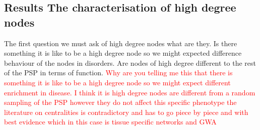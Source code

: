 \subsection{Results The characterisation of high degree nodes}
The first question we must ask of high degree nodes what are they. Is there something it is like to be a high degree node so we might expected difference behaviour of the nodes in disorders.
Are nodes of high degree different to the rest of the PSP in terms of function. 
\textcolor{red}{Why are you telling me this that there is something it is like to be a high degree node so we might expect different enrichment in disease. I think it is high degree nodes are different from a random sampling of the PSP however they do not affect this specific phenotype the literature on centralities is contradictory and has to go piece by piece and with best evidence which in this case is tissue specific networks and GWA}


